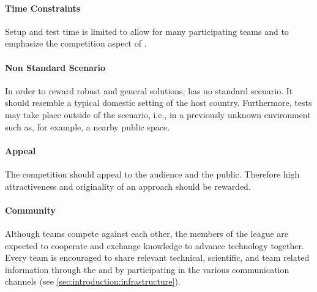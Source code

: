 \paragraph{Time Constraints}
\label{sec:concepts:timeconstraints}
Setup and test time is limited to allow for many participating teams and to emphasize the competition aspect of \AtHome{}.

\paragraph{Non Standard Scenario}
\label{sec:concepts:nonstandardscenario}
In order to reward robust and general solutions, \RoboCup\AtHome{} has no standard scenario. It should resemble a typical domestic setting of the host country. Furthermore, tests may take place outside of the scenario, i.e., in a previously unknown environment such as, for example, a nearby public space.

\paragraph{Appeal}
\label{sec:concepts:appeal}
The competition should appeal to the audience and the public. Therefore high attractiveness and originality of an approach should be rewarded.

\paragraph{Community}
\label{sec:concepts:community}
Although teams compete against each other, the members of the \AtHome{} league are expected to cooperate and exchange knowledge to advance technology together. Every team is encouraged to share relevant technical, scientific, and team related information through the \TDP{} and by participating in the various communication channels (see \ref{sec:introduction:infrastructure}).



